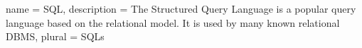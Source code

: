 {
  name = SQL,
  description = {The Structured Query Language is a popular query language based
  on the relational model. It is used by many known relational \gls{DBMS}},
  plural = SQLs
}
